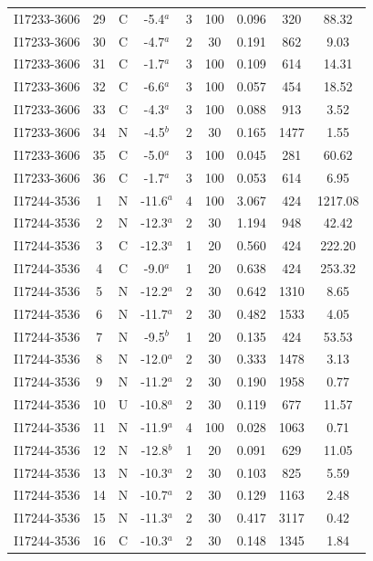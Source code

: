 \begin{table}
\begin{tabular}{ccccccccc}
I17233-3606 & 29 & C & -5.4$^{a}$ & 3 & 100 & 0.096 & 320 & 88.32 \\
I17233-3606 & 30 & C & -4.7$^{a}$ & 2 & 30 & 0.191 & 862 & 9.03 \\
I17233-3606 & 31 & C & -1.7$^{a}$ & 3 & 100 & 0.109 & 614 & 14.31 \\
I17233-3606 & 32 & C & -6.6$^{a}$ & 3 & 100 & 0.057 & 454 & 18.52 \\
I17233-3606 & 33 & C & -4.3$^{a}$ & 3 & 100 & 0.088 & 913 & 3.52 \\
I17233-3606 & 34 & N & -4.5$^{b}$ & 2 & 30 & 0.165 & 1477 & 1.55 \\
I17233-3606 & 35 & C & -5.0$^{a}$ & 3 & 100 & 0.045 & 281 & 60.62 \\
I17233-3606 & 36 & C & -1.7$^{a}$ & 3 & 100 & 0.053 & 614 & 6.95 \\
I17244-3536 & 1 & N & -11.6$^{a}$ & 4 & 100 & 3.067 & 424 & 1217.08 \\
I17244-3536 & 2 & N & -12.3$^{a}$ & 2 & 30 & 1.194 & 948 & 42.42 \\
I17244-3536 & 3 & C & -12.3$^{a}$ & 1 & 20 & 0.560 & 424 & 222.20 \\
I17244-3536 & 4 & C & -9.0$^{a}$ & 1 & 20 & 0.638 & 424 & 253.32 \\
I17244-3536 & 5 & N & -12.2$^{a}$ & 2 & 30 & 0.642 & 1310 & 8.65 \\
I17244-3536 & 6 & N & -11.7$^{a}$ & 2 & 30 & 0.482 & 1533 & 4.05 \\
I17244-3536 & 7 & N & -9.5$^{b}$ & 1 & 20 & 0.135 & 424 & 53.53 \\
I17244-3536 & 8 & N & -12.0$^{a}$ & 2 & 30 & 0.333 & 1478 & 3.13 \\
I17244-3536 & 9 & N & -11.2$^{a}$ & 2 & 30 & 0.190 & 1958 & 0.77 \\
I17244-3536 & 10 & U & -10.8$^{a}$ & 2 & 30 & 0.119 & 677 & 11.57 \\
I17244-3536 & 11 & N & -11.9$^{a}$ & 4 & 100 & 0.028 & 1063 & 0.71 \\
I17244-3536 & 12 & N & -12.8$^{b}$ & 1 & 20 & 0.091 & 629 & 11.05 \\
I17244-3536 & 13 & N & -10.3$^{a}$ & 2 & 30 & 0.103 & 825 & 5.59 \\
I17244-3536 & 14 & N & -10.7$^{a}$ & 2 & 30 & 0.129 & 1163 & 2.48 \\
I17244-3536 & 15 & N & -11.3$^{a}$ & 2 & 30 & 0.417 & 3117 & 0.42 \\
I17244-3536 & 16 & C & -10.3$^{a}$ & 2 & 30 & 0.148 & 1345 & 1.84 \\

\end{tabular}
\end{table}
